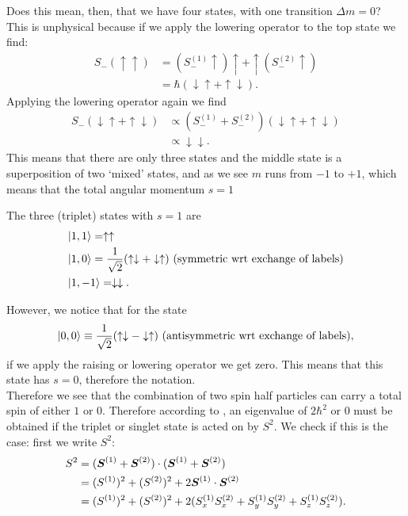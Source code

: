 Does this mean, then, that we have four states, with one transition $\Delta m=0$? 
This is unphysical because if we apply the lowering operator to the top state we find:
\begin{equation}
\begin{aligned}
S_-(\uparrow\uparrow)&=(S_-^{(1)}\uparrow)\uparrow+\uparrow(S_-^{(2)}\uparrow)\\
&=\hbar(\downarrow\uparrow+\uparrow\downarrow). 
\end{aligned}
\end{equation}
Applying the lowering operator again we find
\begin{equation}
\begin{aligned}
S_-(\downarrow\uparrow+\uparrow\downarrow)&\propto(S_-^{(1)}+S_-^{(2)})(\downarrow\uparrow+\uparrow\downarrow)\\
&\propto \downarrow\downarrow.
\end{aligned}
\end{equation}
This means that there are only three states and the middle state is a 
superposition of two `mixed' states, and as we see $m$ runs from $-1$ to $+1$, 
which means that the total angular momentum $s=1$ 
\begin{prt}
The three (triplet) states with $s=1$ are
\begin{equation}
\begin{aligned}
&|1,1\rgl=\uparrow\uparrow\\
&|1,0\rgl=\frac{1}{\sqrt{2}}(\uparrow\downarrow+\downarrow\uparrow)\ (\text{symmetric wrt exchange of labels})\\
&|1,-1\rgl=\downarrow\downarrow. 
\end{aligned}
\end{equation}
\end{prt}
However, we notice that for the state 
\begin{equation}
|0,0\rgl\equiv\frac{1}{\sqrt{2}}(\uparrow\downarrow-\downarrow\uparrow)\ (\text{antisymmetric wrt exchange of labels}),
\end{equation}
if we apply the raising or lowering operator we get zero. This means that this 
state has $s=0$, therefore the notation. \\
Therefore we see that the combination of two spin half particles can carry 
a total spin of either $1$ or $0$. Therefore according to , 
an eigenvalue of $2\hbar^2$ or $0$ must be obtained if the triplet or singlet 
state is acted on by $S^2$. We check if this is the case: first we write $S^2$:
\begin{equation}
\begin{aligned}
S^2&=(\boldsymbol{S}^{(1)}+\boldsymbol{S}^{(2)})\cdot(\boldsymbol{S}^{(1)}+\boldsymbol{S}^{(2)})\\
&=(S^{(1)})^2+(S^{(2)})^2+2\boldsymbol{S}^{(1)}\cdot\boldsymbol{S}^{(2)}\\
&=(S^{(1)})^2+(S^{(2)})^2+2(S_x^{(1)}S_x^{(2)}+S_y^{(1)}S_y^{(2)}+S_z^{(1)}S_z^{(2)}).
\end{aligned}
\end{equation}
